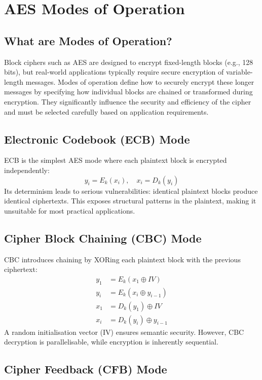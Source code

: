 \section{AES Modes of Operation}

\subsection{What are Modes of Operation?}

Block ciphers such as AES are designed to encrypt fixed-length blocks (e.g., 128 bits), 
but real-world applications typically require secure encryption of variable-length messages. 
Modes of operation define how to securely encrypt these longer messages by specifying how individual blocks are chained or transformed during encryption. 
They significantly influence the security and efficiency of the cipher and must be selected carefully based on application requirements.

\subsection{Electronic Codebook (ECB) Mode}

ECB is the simplest AES mode where each plaintext block is encrypted independently:
\[
y_i = E_k(x_i), \quad x_i = D_k(y_i)
\]
Its determinism leads to serious vulnerabilities: identical plaintext blocks produce identical ciphertexts. 
This exposes structural patterns in the plaintext, making it unsuitable for most practical applications.

\subsection{Cipher Block Chaining (CBC) Mode}

CBC introduces chaining by XORing each plaintext block with the previous ciphertext:
\[
\begin{aligned}
y_1 &= E_k(x_1 \oplus IV) \\
y_i &= E_k(x_i \oplus y_{i-1}) \\
x_1 &= D_k(y_1) \oplus IV \\
x_i &= D_k(y_i) \oplus y_{i-1}
\end{aligned}
\]
A random initialisation vector (IV) ensures semantic security. 
However, CBC decryption is parallelisable, while encryption is inherently sequential.

\subsection{Cipher Feedback (CFB) Mode}

